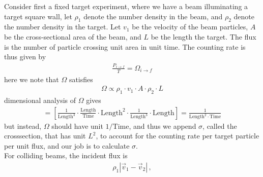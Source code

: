 \documentclass[11pt, onesided]{book}
\theoremstyle{break}
\theoremstyle{break}
\begin{document}
Consider first a fixed target experiment, where we have a beam illuminating a target square wall, let $\rho_1$ denote the number density in the beam, and $\rho_2$ denote the number density in the target. Let $v_1$ be the velocity of the beam particles, $A$ be the cross-sectional area of the beam, and $L$ be the length the target. The flux is the number of particle crossing unit area in unit time. The counting rate is thus given by
\begin{align*}
\frac{P_{i\to f}}{T} = \Omega_{i \to f}
\end{align*}
here we note that $\Omega$ satisfies
\begin{align*}
\Omega \propto \rho_1 \cdot v_1 \cdot A \cdot \rho_2 \cdot L
\end{align*}
dimensional analysis of $\Omega$ gives
\begin{align*}
[ \rho_1 \cdot v_1 \cdot A \cdot \rho_2 \cdot L] =\left[\frac{1}{\text{Length}^3} \cdot \frac{\text{Length}}{\text{Time}}\cdot \text{Length}^2 \cdot \frac{1}{\text{Length}^3} \cdot \text{Length} \right] =\frac{1}{\text{Length}^2\cdot \text{Time}}
\end{align*}
but instead, $\Omega$ should have unit $1/\text{Time}$, and thus we append $\sigma$, called the crosssection, that has unit $L^2$, to account for the counting rate per target particle per unit flux, and our job is to calculate $\sigma$. \\

For colliding beams, the incident flux is 
\begin{align*}
\rho_1 | \vec{v}_1 - \vec{v}_2|\,,
\end{align*}
\end{document}
